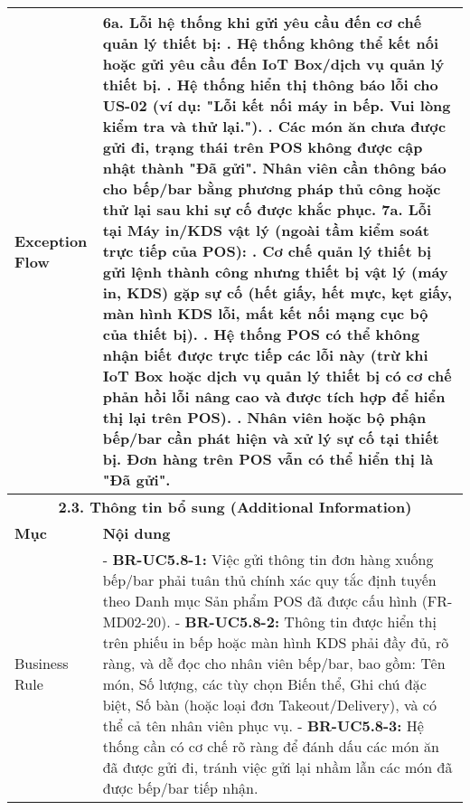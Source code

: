 \begin{longtable}{|m{4cm}|p{11cm}|}
\hline
Exception Flow & \textbf{6a. Lỗi hệ thống khi gửi yêu cầu đến cơ chế quản lý thiết bị:} \newline    1. Hệ thống không thể kết nối hoặc gửi yêu cầu đến IoT Box/dịch vụ quản lý thiết bị. \newline    2. Hệ thống hiển thị thông báo lỗi cho US-02 (ví dụ: "Lỗi kết nối máy in bếp. Vui lòng kiểm tra và thử lại."). \newline    3. Các món ăn chưa được gửi đi, trạng thái trên POS không được cập nhật thành "Đã gửi". Nhân viên cần thông báo cho bếp/bar bằng phương pháp thủ công hoặc thử lại sau khi sự cố được khắc phục. \newline \textbf{7a. Lỗi tại Máy in/KDS vật lý (ngoài tầm kiểm soát trực tiếp của POS):} \newline    1. Cơ chế quản lý thiết bị gửi lệnh thành công nhưng thiết bị vật lý (máy in, KDS) gặp sự cố (hết giấy, hết mực, kẹt giấy, màn hình KDS lỗi, mất kết nối mạng cục bộ của thiết bị). \newline    2. Hệ thống POS có thể không nhận biết được trực tiếp các lỗi này (trừ khi IoT Box hoặc dịch vụ quản lý thiết bị có cơ chế phản hồi lỗi nâng cao và được tích hợp để hiển thị lại trên POS). \newline    3. Nhân viên hoặc bộ phận bếp/bar cần phát hiện và xử lý sự cố tại thiết bị. Đơn hàng trên POS vẫn có thể hiển thị là "Đã gửi". \\
\hline
\multicolumn{2}{|c|}{\textbf{2.3. Thông tin bổ sung (Additional Information)}} \\
\hline
\textbf{Mục} & \textbf{Nội dung} \\
\hline
Business Rule & - \textbf{BR-UC5.8-1:} Việc gửi thông tin đơn hàng xuống bếp/bar phải tuân thủ chính xác quy tắc định tuyến theo Danh mục Sản phẩm POS đã được cấu hình (FR-MD02-20). \newline - \textbf{BR-UC5.8-2:} Thông tin được hiển thị trên phiếu in bếp hoặc màn hình KDS phải đầy đủ, rõ ràng, và dễ đọc cho nhân viên bếp/bar, bao gồm: Tên món, Số lượng, các tùy chọn Biến thể, Ghi chú đặc biệt, Số bàn (hoặc loại đơn Takeout/Delivery), và có thể cả tên nhân viên phục vụ. \newline - \textbf{BR-UC5.8-3:} Hệ thống cần có cơ chế rõ ràng để đánh dấu các món ăn đã được gửi đi, tránh việc gửi lại nhầm lẫn các món đã được bếp/bar tiếp nhận. \\
\hline

\end{longtable}
